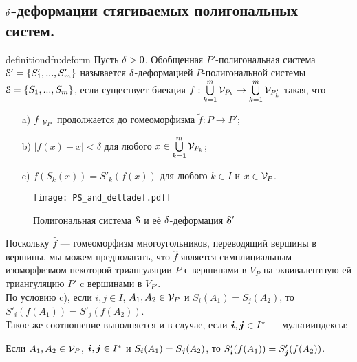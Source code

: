 \subsection{ $\delta$-деформации стягиваемых полигональных систем.}
\begin{restatethis}{definition}{dfn:deform}\label{dfn:deform} 
Пусть $\delta>0$. Обобщенная $P'$-полигональная система ${\EuScript S}'=\{S'_1,...,S'_m\}$ называется $\delta$-деформацией $P$-полигональной системы ${\EuScript S}=\{S_1,...,S_m\}$, если существует биекция $f:\bigcup\limits_{k=1}^m {\mathcal V}_{P_k}\to \bigcup\limits_{k=1}^m {\mathcal V}_{P'_k}$ такая, что
\begin{itemize}[nolistsep]
    \item[a)] $f|_{{\mathcal V}_P}$ продолжается до гомеоморфизма $\tilde f: P\to  P'$;
    \item[b)] $|f(x)-x|<\delta$  для любого $x\in \bigcup\limits_{k=1}^m {\mathcal V}_{P_k}$;
    \item[c)] $f(S_k(x))=S'_k(f(x))$ для любого $k\in I$ и $x\in {\mathcal V}_P$.
\end{itemize}    
\end{restatethis}


\begin{figure}[H]
    \centering
    \texttt{[image: PS\_and\_deltadef.pdf]}
    \caption{Полигональная система ${\EuScript S}$ и её $\delta$-деформация ${\EuScript S}'$ }
    \label{img:ddef}
\end{figure}

Поскольку $\hat f$ --- гомеоморфизм многоугольников, переводящий вершины в вершины, мы можем предполагать, что $\hat f$ является симплициальным изоморфизмом некоторой триангуляции $P$ с вершинами в $V_P$ на эквивалентную ей триангуляцию $P'$ c вершинами в $V_{P'}$.\\ 
 
По условию c), если  $i,j\in I$, $A_1,A_2\in {\mathcal V}_P$ и $S_i(A_1)=S_j(A_2)$, то $S'_i( f(A_1))=S'_j(f(A_2))$.\\  Такое же соотношение выполняется и в случае, если ${\bm{i}},{\bm{j}}\in I^*$ --- мультииндексы:

\begin{lemma}\label{bibj}
Если $A_1,A_2\in {\mathcal V}_P$, ${\bm{i}},{\bm{j}}\in I^*$ и $S_{\bm{i}}(A_1)=S_{\bm{j}}(A_2)$, то $S'_{\bm{i}}( f(A_1))=S'_{\bm{j}}( f(A_2))$.
\end{lemma}
 
